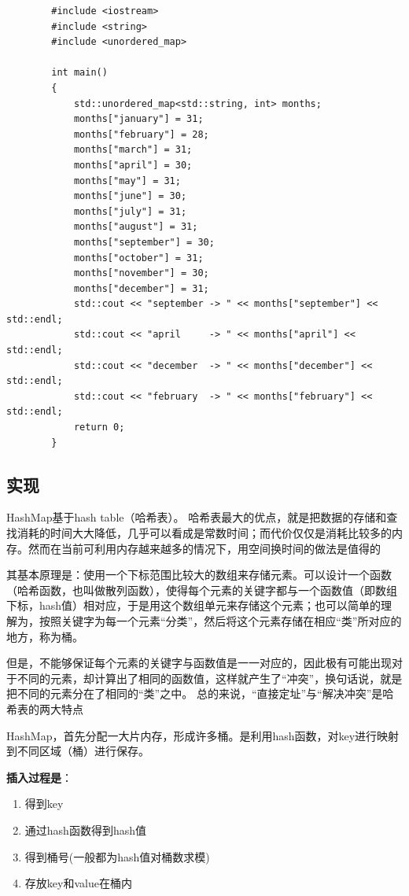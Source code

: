 \documentclass[UTF8,a4paper,12pt]{ctexbook}
\begin{document}
		\begin{lstlisting}
		#include <iostream>
		#include <string>
		#include <unordered_map>
		
		int main()
		{
			std::unordered_map<std::string, int> months;
			months["january"] = 31;
			months["february"] = 28;
			months["march"] = 31;
			months["april"] = 30;
			months["may"] = 31;
			months["june"] = 30;
			months["july"] = 31;
			months["august"] = 31;
			months["september"] = 30;
			months["october"] = 31;
			months["november"] = 30;
			months["december"] = 31;
			std::cout << "september -> " << months["september"] << std::endl;
			std::cout << "april     -> " << months["april"] << std::endl;
			std::cout << "december  -> " << months["december"] << std::endl;
			std::cout << "february  -> " << months["february"] << std::endl;
			return 0;
		}
		\end{lstlisting}
		\subsection{实现}
			HashMap基于hash table（哈希表）。 哈希表最大的优点，就是把数据的存储和查找消耗的时间大大降低，几乎可以看成是常数时间；而代价仅仅是消耗比较多的内存。然而在当前可利用内存越来越多的情况下，用空间换时间的做法是值得的 
			
			其基本原理是：使用一个下标范围比较大的数组来存储元素。可以设计一个函数（哈希函数，也叫做散列函数），使得每个元素的关键字都与一个函数值（即数组下标，hash值）相对应，于是用这个数组单元来存储这个元素；也可以简单的理解为，按照关键字为每一个元素“分类”，然后将这个元素存储在相应“类”所对应的地方，称为桶。
			
			但是，不能够保证每个元素的关键字与函数值是一一对应的，因此极有可能出现对于不同的元素，却计算出了相同的函数值，这样就产生了“冲突”，换句话说，就是把不同的元素分在了相同的“类”之中。 总的来说，“直接定址”与“解决冲突”是哈希表的两大特点  
			
			HashMap，首先分配一大片内存，形成许多桶。是利用hash函数，对key进行映射到不同区域（桶）进行保存。
			
			\textbf{插入过程是}：
				\begin{enumerate}[itemindent = 1em]
					\item 得到key
					\item 通过hash函数得到hash值
					\item 得到桶号(一般都为hash值对桶数求模)
					\item 存放key和value在桶内
				\end{enumerate}
			
\end{document}
